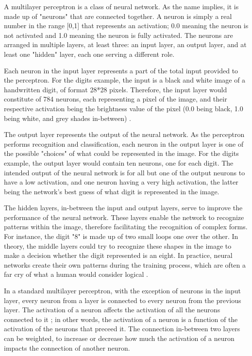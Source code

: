 \documentclass[12pt,a4paper,titlepage]{article}
\begin{document}
A multilayer perceptron is a class of neural network. As the name implies, it is made up of "neurons" that are connected together. A neuron is simply a real number in the range [0,1] that represents an activation; 0.0 meaning the neuron is not activated and 1.0 meaning the neuron is fully activated. The neurons are arranged in multiple layers, at least three: an input layer, an output layer, and at least one "hidden" layer, each one serving a different role.

Each neuron in the input layer represents a part of the total input provided to the perceptron. For the digits example, the input is a black and white image of a handwritten digit, of format 28*28 pixels. Therefore, the input layer would constitute of 784 neurons, each representing a pixel of the image, and their respective activation being the brightness value of the pixel (0.0 being black, 1.0 being white, and grey shades in-between) \cite{sanderson_but_2017}.

The output layer represents the output of the neural network. As the perceptron performs recognition and classification, each neuron in the output layer is one of the possible "choices" of what could be represented in the image. For the digits example, the output layer would contain ten neurons, one for each digit. The intended output of the neural network is for all but one of the output neurons to have a low activation, and one neuron having a very high activation, the latter being the network's best guess of what digit is represented in the image.

The hidden layers, in-between the input and output layers, serve to improve the performance of the neural network. These layers enable the network to recognize patterns within the image, therefore facilitating the recognition of complex forms. For instance, the digit "8" is made up of two small loops one over the other. In theory, the middle layers could try to recognize these shapes in the image to make a decision whether the digit represented is an eight. In practice, neural networks create their own patterns during the training process, which are often a far cry of what a human would consider logical \cite{sanderson_gradient_2017}.

In a standard multilayer perceptron, with the exception of neurons in the input layer, every neuron from a layer is connected to every neuron from the previous layer. The activation of a neuron affects the activation of all the neurons connected to it ; in other words, the activation of a neuron is a function of the activation of the neurons that preceed it. The connection in-between two layers can be weighted, to increase or decrease how much the activation of a neuron impacts the connection of another neuron.
\end{document}
